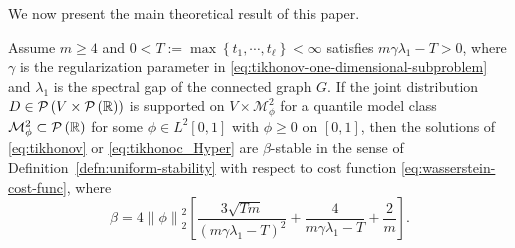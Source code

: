 \documentclass[letterpaper]{article} %
\begin{document}

We now present the main theoretical result of this paper. 
\begin{proposition}
  \label{prop:alg-stability-slp}
  Assume $m\geq 4$ and $0<T:=\max \left\{ t_1,\cdots,t_{\ell} \right\}<\infty$ satisfies $m\gamma\lambda_1-T>0$, where $\gamma$ is the regularization parameter in \eqref{eq:tikhonov-one-dimensional-subproblem} and $\lambda_1$ is the spectral gap of the connected graph $G$. If the joint distribution $D\in\P\left( V\times \P\left( \mathbb{R} \right) \right)$ is supported on $V\times \mathcal{M}_{\phi}^2$ for a quantile model class $\mathcal{M}_{\phi}^2\subset \P\left( \mathbb{R} \right)$ for some $\phi\in L^2 \left[ 0,1 \right]$ with $\phi\geq 0$ on $\left[ 0,1 \right]$, then the solutions of \eqref{eq:tikhonov} or \eqref{eq:tikhonoc_Hyper} are $\beta$-stable in the sense of Definition~\ref{defn:uniform-stability} with respect to cost function \eqref{eq:wasserstein-cost-func}, where
  \begin{equation*}
    \beta=4\left\| \phi \right\|_2^2\left[\frac{3\sqrt{Tm}}{\left( m\gamma\lambda_1-T \right)^2}+\frac{4}{m\gamma\lambda_1-T}+\frac{2}{m}\right].
  \end{equation*}
\end{proposition}
\end{document}
